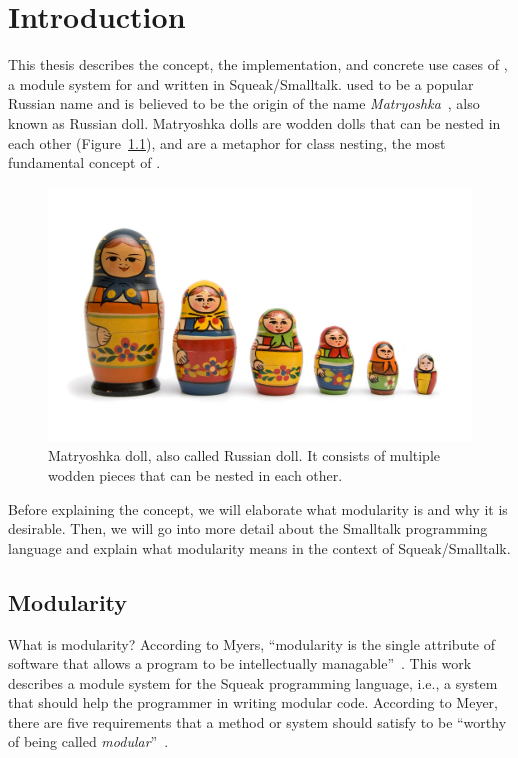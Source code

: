 \chapter{Introduction}
This thesis describes the concept, the implementation, and concrete use cases of \emph{\msname}, a module system for and written in Squeak/Smalltalk. \msname used to be a popular Russian name and is believed to be the origin of the name \emph{Matryoshka}~\cite{dixon1998encyclopedia}, also known as Russian doll. Matryoshka dolls are wodden dolls that can be nested in each other (Figure~\ref{fig:matryoshka}), and are a metaphor for class nesting, the most fundamental concept of \msname.

\begin{figure}[!htp]
	\includegraphics[width=\textwidth]{matryoshka.jpg}
	\caption[Matryoshka doll]{Matryoshka doll, also called Russian doll. It consists of multiple wodden pieces that can be nested in each other.}
	\label{fig:matryoshka}
\end{figure}

Before explaining the concept, we will elaborate what modularity is and why it is desirable. Then, we will go into more detail about the Smalltalk programming language and explain what modularity means in the context of Squeak/Smalltalk.

\section{Modularity}
What is modularity? According to Myers, ``modularity is the single attribute of software that allows a program to be intellectually managable''~\cite{myers1978composite}. This work describes a module system for the Squeak programming language, i.e., a system that should help the programmer in writing modular code. According to Meyer, there are five requirements that a method or system should satisfy to be ``worthy of being called \emph{modular}''~\cite{Meyer:1988:OSC:534929}.

